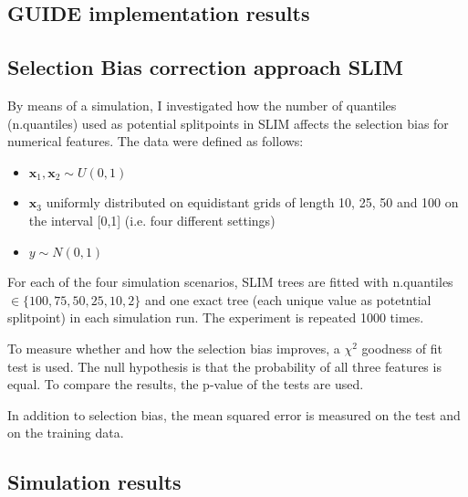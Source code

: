 \subsection{GUIDE implementation results}

\subsection{Selection Bias correction approach SLIM}

By means of a simulation, I investigated how the number of quantiles (n.quantiles) used as potential splitpoints in SLIM affects the selection bias for numerical features. 
The data were defined as follows:
\begin{itemize}
    \item $\textbf{x}_1, \textbf{x}_2 \sim U(0,1)$
    \item $\textbf{x}_3$ uniformly distributed on equidistant grids of length 10, 25, 50 and 100 on the interval [0,1] (i.e. four different settings)
    \item $y \sim N(0,1)$
\end{itemize}

For each of the four simulation scenarios, SLIM trees are fitted  with n.quantiles $\in \{100, 75, 50, 25, 10, 2\}$ and one exact tree (each unique value as potetntial splitpoint) in each simulation run. The experiment is repeated 1000 times.

To measure whether and how the selection bias improves, a $\chi^2$ goodness of fit test is used. The null hypothesis is that the probability of all three features is equal. To compare the results, the p-value of the tests are used.

In addition to selection bias, the mean squared error is measured on the test and on the training data.





\subsection{Simulation results}
